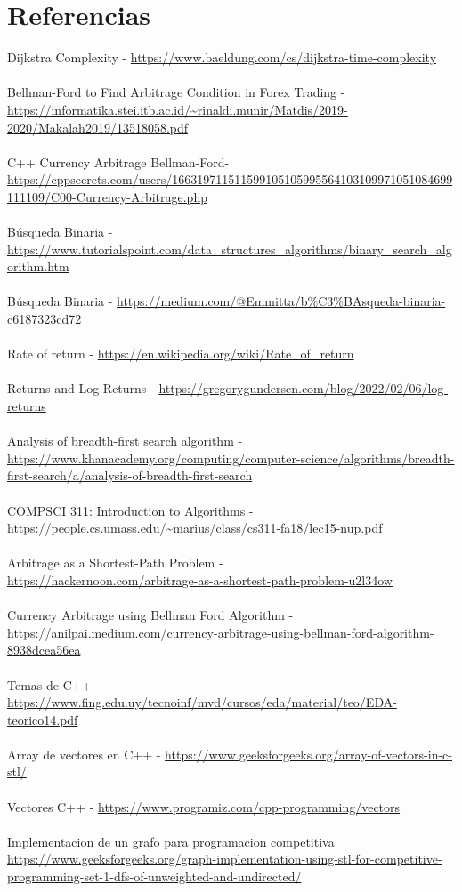 \documentclass{article}
\begin{document}
\newpage
\section{Referencias}
Dijkstra Complexity - \url{https://www.baeldung.com/cs/dijkstra-time-complexity}\\\\
Bellman-Ford to Find Arbitrage Condition in Forex Trading - \url{https://informatika.stei.itb.ac.id/~rinaldi.munir/Matdis/2019-2020/Makalah2019/13518058.pdf}\\\\
C++ Currency Arbitrage Bellman-Ford- \url{https://cppsecrets.com/users/166319711511599105105995564103109971051084699111109/C00-Currency-Arbitrage.php}\\\\
Búsqueda Binaria - \url{https://www.tutorialspoint.com/data_structures_algorithms/binary_search_algorithm.htm}\\\\
Búsqueda Binaria - \url{https://medium.com/@Emmitta/b%C3%BAsqueda-binaria-c6187323cd72}\\\\
Rate of return - \url{https://en.wikipedia.org/wiki/Rate_of_return}\\\\
Returns and Log Returns - \url{https://gregorygundersen.com/blog/2022/02/06/log-returns}\\\\
Analysis of breadth-first search algorithm - \url{https://www.khanacademy.org/computing/computer-science/algorithms/breadth-first-search/a/analysis-of-breadth-first-search}\\\\
COMPSCI 311: Introduction to Algorithms - \\\url{https://people.cs.umass.edu/~marius/class/cs311-fa18/lec15-nup.pdf}\\\\
Arbitrage as a Shortest-Path Problem - \\\url{https://hackernoon.com/arbitrage-as-a-shortest-path-problem-u2l34ow}\\\\
Currency Arbitrage using Bellman Ford Algorithm - \\\url{https://anilpai.medium.com/currency-arbitrage-using-bellman-ford-algorithm-8938dcea56ea}\\\\
Temas de C++ - \\\url{https://www.fing.edu.uy/tecnoinf/mvd/cursos/eda/material/teo/EDA-teorico14.pdf}\\\\
Array de vectores en C++ - \url{https://www.geeksforgeeks.org/array-of-vectors-in-c-stl/}\\\\
Vectores C++ - \url{https://www.programiz.com/cpp-programming/vectors}\\\\
Implementacion de un grafo para programacion competitiva \\ \url{https://www.geeksforgeeks.org/graph-implementation-using-stl-for-competitive-programming-set-1-dfs-of-unweighted-and-undirected/}
\end{document}
